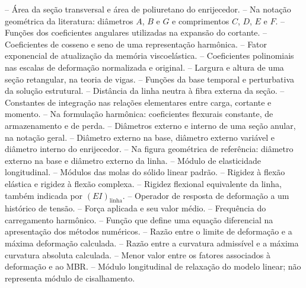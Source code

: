 \documentclass[arial,centeredequations,english,brazilian,oneside,section=TITLE]{ifes8}
\begin{document}
\begin{simbolos}
   -- Área da seção transversal e área de poliuretano do enrijecedor.
   -- Na notação geométrica da literatura: diâmetros $A$, $B$ e $G$ e comprimentos $C$, $D$, $E$ e $F$.
   -- Funções dos coeficientes angulares utilizadas na expansão do cortante.
   -- Coeficientes de cosseno e seno de uma representação harmônica.
   -- Fator exponencial de atualização da memória viscoelástica.
   -- Coeficientes polinomiais nas escalas de deformação normalizada e original.
   -- Largura e altura de uma seção retangular, na teoria de vigas.
   -- Funções da base temporal e perturbativa da solução estrutural.
   -- Distância da linha neutra à fibra externa da seção.
   -- Constantes de integração nas relações elementares entre carga, cortante e momento.
   -- Na formulação harmônica: coeficientes flexurais constante, de armazenamento e de perda.
   -- Diâmetros externo e interno de uma seção anular, na notação geral.
   -- Diâmetro externo na base, diâmetro externo variável e diâmetro interno do enrijecedor.
   -- Na figura geométrica de referência: diâmetro externo na base e diâmetro externo da linha.
   -- Módulo de elasticidade longitudinal.
   -- Módulos das molas do sólido linear padrão.
   -- Rigidez à flexão elástica e rigidez à flexão complexa.
   -- Rigidez flexional equivalente da linha, também indicada por $(EI)_{\mathrm{linha}}$.
   -- Operador de resposta de deformação a um histórico de tensão.
   -- Força aplicada e seu valor médio.
   -- Frequência do carregamento harmônico.
   -- Função que define uma equação diferencial na apresentação dos métodos numéricos.
   -- Razão entre o limite de deformação e a máxima deformação calculada.
   -- Razão entre a curvatura admissível e a máxima curvatura absoluta calculada.
   -- Menor valor entre os fatores associados à deformação e ao MBR.
   -- Módulo longitudinal de relaxação do modelo linear; não representa módulo de cisalhamento.

\end{simbolos}
\end{document}
